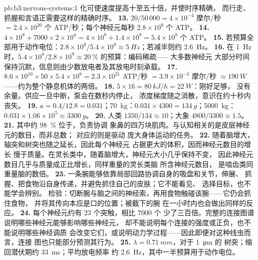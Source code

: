 \begin{solution}{pb:b3:nervous-systems:1}
化可使速度提高十至五十倍，并使时序精确，
而行走、抓握和言语正需要这样的精确时序。
\textbf{13.} $20/50\,000 = 4\times 10^{-4}$ 摩尔/秒 $= 2.4\times 10^{20}$
个 ATP/秒；每个神经元每秒 $2.8\times 10^{9}$ 个 ATP。
\textbf{14.} $4\times 10^{8} + 7000\times 2\times 10^{4} = 4\times 10^{8}
+ 1.4\times 10^{8} = 5.4\times 10^{8}$ 个 ATP。
\textbf{15.} 若预算全部用于动作电位：$2.8\times 10^{9}/5.4\times 10^{8} \approx
\qty{5}{Hz}$；若减半则约 \qty{2.6}{Hz}。
\textbf{16.} 在 \qty{1}{Hz} 时，$5.4\times 10^{8}/2.8\times 10^{9} \approx
\qty{20}{\%}$ 的预算：编码稀疏——大多数神经元
大部分时间保持沉默，信息则由少数放电者及其放电时刻承载。
\textbf{17.} $8.6\times 10^{10}\times 50\times 5.4\times 10^{8} = 2.3
\times 10^{21}$ ATP/秒 $= 3.9\times 10^{-3}$ 摩尔/秒 $\approx \qty{190}{W}$
——约为整个静息机体的两倍。
\textbf{18.} $5\times 16 = \qty{80}{kJ/h} = \qty{22}{W}$：刚好足够，
没有余量。供应一旦中断，泵会在数秒内停止，
浓度梯度随之消散，意识在约十秒内丧失。
\textbf{19.} $a = 0.4/12.8 = 0.031$；\qty{70}{kg}：$0.031\times 4300 =
\qty{134}{g}$；\qty{5000}{kg}：$0.031\times 1.06\times 10^{5} \approx
\qty{3300}{g}$。
\textbf{20.} 人类 $1350/134 \approx 10$；大象 $4800/3300 \approx
1.5$。
\textbf{21.} 其中约 \qty{98}{\%} 位于，负责协调
象鼻的四万块肌肉。与认知相关的是皮层神经元的数目，而非总数；
对应的则是驱动
庞大身体运动的任务。
\textbf{22.} 随着脑增大，轴突和树突也随之延长，因此每个神经元
占据更大的体积，因而神经元数目的增长
慢于质量。在灵长类中，随着脑增大，神经元大小几乎保持不变，
因此神经元数目几乎与质量成正比增长，同样重量的灵长类脑
所含神经元数目，
是啮齿类同重量脑的数倍。
\textbf{23.} 一条腕能够依靠局部回路协调自身的吸盘和关节，伸展、
抓握、把食物沿自身传递，并避免抓住自己的皮肤；它不能看见、
选择目标，也不能学会辨别。
检验：切断腕与脑之间的神经索，再用食物触碰该腕——它仍会抓住食物，
并将其传向本应是口的位置；被截下的腕
在一小时内也会做出同样的反应。
\textbf{24.} 每个神经元约有 $23$ 个突触，相比 $7000$ 个
少了三百倍。完整的连接图谱说明哪些神经元能够影响哪些神经元，
却不能说明每个连接的强度或正负，也不能说明哪些神经调质
会改变它们，或说明动力学过程——因此即便对这种线虫而言，连接
图也只能部分预测其行为。
\textbf{25.} $\lambda = \qty{0.71}{mm}$，对于 \qty{1}{\micro m} 的
树突；缩回潜伏期约 \qty{33}{ms}；平均放电频率
约 \qty{2.6}{Hz}，其中一半预算用于动作电位。
\end{solution}
